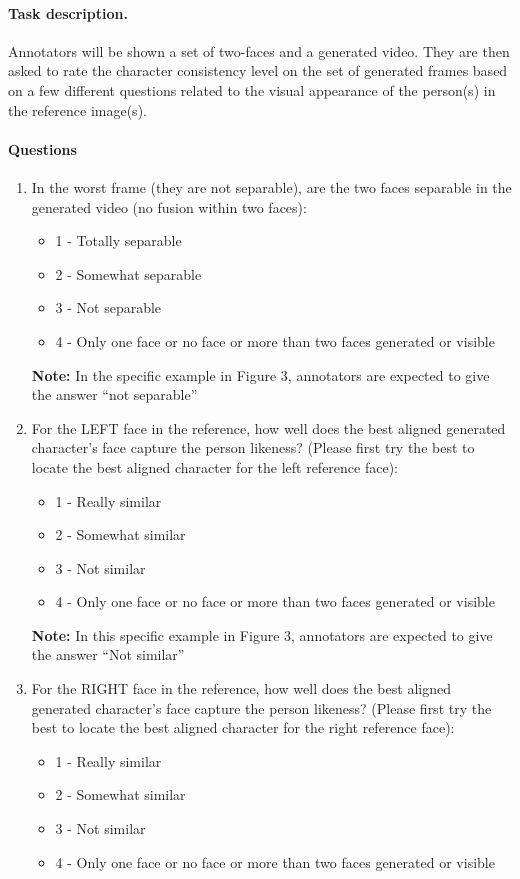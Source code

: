 \paragraph{Task description.} Annotators will be shown a set of two-faces and a generated video.
They are then asked to rate the character consistency level on the set of generated frames based on a few different questions related to the visual appearance of the person(s) in the reference image(s). 

\paragraph{Questions}
\begin{enumerate}[label=-]
    \item In the worst frame (they are not separable), are the two faces separable in the generated video (no fusion within two faces):
    \begin{itemize}
        \item [ ] 1 - Totally separable
        \item [ ] 2 - Somewhat separable
        \item [ ] 3 - Not separable
        \item [ ] 4 - Only one face or no face or more than two faces generated or visible
    \end{itemize}
    
    \textbf{Note:} In the specific example in Figure 3, annotators are expected to give the answer ``not separable''
    \item For the LEFT face in the reference, how well does the best aligned generated character’s face capture the person likeness? (Please first try the best to locate the best aligned character for the left reference face):
    \begin{itemize}
        \item [ ] 1 - Really similar
        \item [ ] 2 - Somewhat similar
        \item [ ] 3 - Not similar
        \item [ ] 4 - Only one face or no face or more than two faces generated or visible
    \end{itemize}
    
    \textbf{Note:} In this specific example in Figure 3, annotators are expected to give the answer ``Not similar''
    \item For the RIGHT face in the reference, how well does the best aligned generated character’s face capture the person likeness? (Please first try the best to locate the best aligned character for the right reference face):
    \begin{itemize}
        \item [ ] 1 - Really similar
        \item [ ] 2 - Somewhat similar
        \item [ ] 3 - Not similar
        \item [ ] 4 - Only one face or no face or more than two faces generated or visible
    \end{itemize}
    

\end{enumerate}
